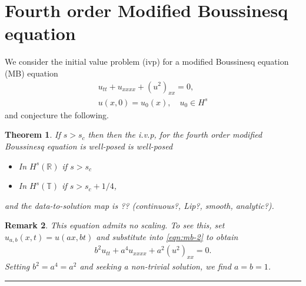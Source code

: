 \documentclass[12pt,reqno]{amsart}
\numberwithin{equation}{section}  %
\numberwithin{figure}{section}
\newcommand{\rr}{\mathbb{R}}
\newcommand{\ci}{\mathbb{T}}
\newtheorem{theorem}{Theorem}[section]
\newtheorem{remark}[theorem]{Remark}
\begin{document}
%
\section{Fourth order Modified Boussinesq  equation}
\label{sec:intro-2}
We consider the initial value problem (ivp) for a modified Boussinesq
equation (MB) equation 
\begin{gather}
  u_{tt}   + u_{xxxx} + (u^2)_{xx} = 0,
  \label{eqn:mb-2}
  \\
  u(x,0) = u_{0}(x), \quad u_{0} \in H^{s}
  \label{eqn:mb-init-data-2}
\end{gather}
and conjecture the following.
%
%
%
%
%
%
%
%
\begin{theorem}
  If $s>s_c$ then 
  then the  i.v.p, for the fourth order modified Boussinesq  equation  is well-posed
  is well-posed 
  \begin{itemize}
    \item In $H^s(\rr)$ if $s > s_c$
    \item In $H^{s}(\ci)$ if $s > s_c + 1/4$,
  \end{itemize}
  and the data-to-solution map is  ?? (continuous?, Lip?, smooth, analytic?). 
  \label{thm:wp-2}
\end{theorem}
%

%
%
\begin{framed}
\begin{remark}
  This equation admits no scaling. To see this, set $u_{a,b}(x,t) =
  u(ax,bt)$ and substitute into \eqref{eqn:mb-2} to obtain
  \begin{equation*}
    \begin{split}
      b^{2}u_{tt} + a^{4}u_{xxxx} + a^{2}(u^{2})_{xx} = 0.
    \end{split}
  \end{equation*}
  Setting $b^{2} = a^{4} = a^{2}$ and seeking a non-trivial solution, we
  find $a=b=1$. 
  \label{rem:scaling}
\end{remark}
\end{framed}
%



\vskip0.1in
\hrule
\vskip0.1in
\end{document}
